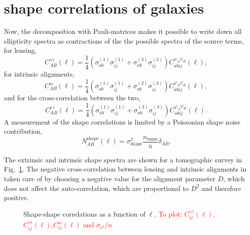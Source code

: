 \documentclass[a4paper,fleqn,usenatbib]{mnras}
\newcommand\BG[1]{\textcolor{red}{#1}}
\begin{document}
\section{shape correlations of galaxies}\label{sect_shapes}
Now, the decomposition with Pauli-matrices makes it possible to write down all ellipticity spectra as contractions of the the possible spectra of the source terms, for lensing,
\begin{equation}
C^{\gamma\gamma}_{AB}(\ell) = \frac{1}{4}
\left(\sigma^{(1)}_{ab}\sigma^{(1)}_{ij} + \sigma^{(3)}_{ab}\sigma^{(3)}_{ij}\right)
C^{\psi_A\psi_B}_{abij}(\ell),
\end{equation}
for intrinsic alignments,
\begin{equation}
C^{\epsilon\epsilon}_{AB}(\ell) = \frac{1}{4}
\left(\sigma^{(1)}_{ab}\sigma^{(1)}_{ij} + \sigma^{(3)}_{ab}\sigma^{(3)}_{ij}\right)
C^{\varphi_A\varphi_B}_{abij}(\ell),
\end{equation}
and for the cross-correlation between the two,
\begin{equation}
C^{\epsilon\gamma}_{AB}(\ell) = \frac{1}{4}
\left(\sigma^{(1)}_{ab}\sigma^{(1)}_{ij} + \sigma^{(3)}_{ab}\sigma^{(3)}_{ij}\right)
C^{\varphi_A\psi_B}_{abij}(\ell).
\end{equation}
A measurement of the shape correlations is limited by a Poissonian shape noise contribution,
\begin{equation}
N_{AB}^\mathrm{shape}(\ell) = \sigma^2_\mathrm{shape}\frac{n_\mathrm{tomo}}{\bar{n}}\delta_{AB}.
\end{equation}


The extrinsic and intrinsic shape spectra are shown for a tomographic survey in Fig.~\ref{fig:shapeshape}. The negative cross-correlation between lensing and intrinsic alignments in taken care of by choosing a negative value for the alignment parameter $D$, which does not affect the auto-correlation, which are proportional to $D^2$ and therefore positive.


\begin{figure}
\centering
\caption{Shape-shape correlations as a function of $\ell$. \BG{To plot: $C_{ij}^{\gamma\gamma}(\ell)$,$C_{ij}^{\gamma\epsilon}(\ell)$,$C_{ij}^{\epsilon\epsilon}(\ell)$ and $\sigma_{\epsilon^2}/n$}}
\label{fig:shapeshape}
\end{figure}


\end{document}
